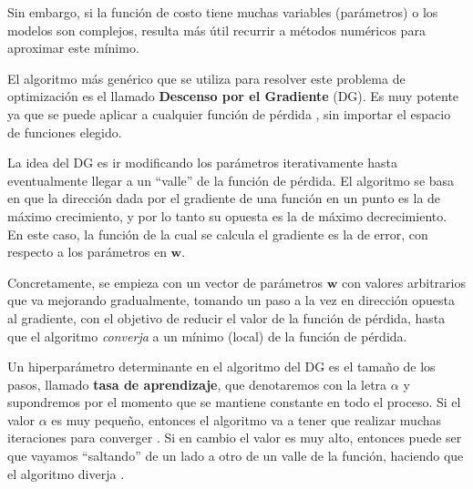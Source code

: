 \documentclass[../../main.tex]{subfiles}
\begin{document}
Sin embargo, si la función de costo tiene muchas variables (parámetros) o los modelos son
complejos, resulta más útil recurrir a métodos numéricos para aproximar este mínimo.

El algoritmo más genérico que se utiliza para resolver este problema de optimización es el
llamado \textbf{Descenso por el Gradiente} (DG). Es muy potente ya que se puede aplicar a
cualquier función de pérdida \cite{ai-a-modern-approach}, sin importar el espacio de
funciones elegido.

La idea del DG es ir modificando los parámetros iterativamente hasta eventualmente llegar
a un ``valle'' de la función de pérdida. El algoritmo se basa en que la dirección dada por
el gradiente\footnotemark{} de una función en un punto es la de máximo crecimiento, y por
lo tanto su opuesta es la de máximo decrecimiento. En este caso, la función de la cual se
calcula el gradiente es la de error, con respecto a los parámetros en \(\bm{w}\).

Concretamente, se empieza con un vector de parámetros \(\bm{w}\) con valores arbitrarios que
va mejorando gradualmente, tomando un paso a la vez en dirección opuesta al gradiente, con
el objetivo de reducir el valor de la función de pérdida, hasta que el algoritmo
\textit{converja} a un mínimo (local) de la función de pérdida.

Un hiperparámetro\footnotemark{} determinante en el algoritmo del DG es el tamaño de los
pasos, llamado \textbf{tasa de aprendizaje}, que denotaremos con la letra \(\alpha\) y
supondremos por el momento que se mantiene constante en todo el proceso. Si el valor
\(\alpha\) es muy pequeño, entonces el algoritmo va a tener que realizar muchas
iteraciones para converger \cite{hands-on-ML-sklearn-tf}. Si en cambio el valor es muy
alto, entonces puede ser que vayamos ``saltando'' de un lado a otro de un valle de la
función, haciendo que el algoritmo diverja \cite{hands-on-ML-sklearn-tf}.
\end{document}
